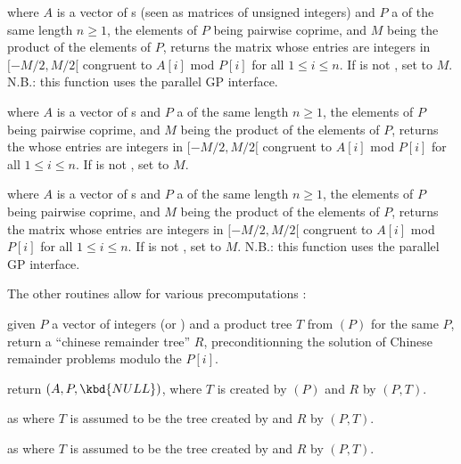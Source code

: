  where $A$ is a
vector of s (seen as matrices of unsigned integers) and $P$ a
 of the same length $n\ge 1$, the elements of $P$ being
pairwise coprime, and $M$ being the product of the elements of $P$, returns
the matrix whose entries are integers in $[-M/2, M/2[$ congruent to $A[i]$
mod $P[i]$ for all $1\leq i\leq n$. If  is not , set
 to $M$. N.B.: this function uses the parallel GP interface.

 where $A$ is a
vector of s and $P$ a
 of the same length $n\ge 1$, the elements of $P$ being
pairwise coprime, and $M$ being the product of the elements of $P$, returns
the  whose entries are integers in $[-M/2, M/2[$ congruent to $A[i]$
mod $P[i]$ for all $1\leq i\leq n$. If  is not , set
 to $M$.

 where $A$ is a
vector of s and $P$ a
 of the same length $n\ge 1$, the elements of $P$ being
pairwise coprime, and $M$ being the product of the elements of $P$, returns
the matrix whose entries are integers in $[-M/2, M/2[$ congruent to $A[i]$
mod $P[i]$ for all $1\leq i\leq n$. If  is not , set
 to $M$. N.B.: this function uses the parallel GP interface.

The other routines allow for various precomputations :

 given $P$ a vector of integers
(or ) and a product tree $T$ from $(P)$
for the same $P$, return a ``chinese remainder tree'' $R$, preconditionning
the solution of Chinese remainder problems modulo the $P[i]$.

return $(A,P,\kbd{NULL})$, where $T$ is created by
$(P)$ and $R$ by $(P,T)$.

as  where $T$ is assumed to be the tree created by
 and $R$ by $(P,T)$.

as  where $T$ is assumed to be the tree created by
 and $R$ by $(P,T)$.

